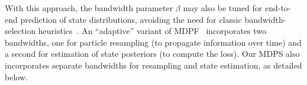         With this approach, the bandwidth parameter $\beta$ may also be tuned for end-to-end prediction of state distributions, avoiding the need for classic bandwidth-selection heuristics~\cite{Silverman86, jones1996brief, bowman1984alternative}.
        An ``adaptive'' variant of MDPF~\cite{younis2023mdpf} incorporates two bandwidths, one for particle resampling (to propagate information over time) and a second for estimation of state posteriors (to compute the loss).  Our MDPS also incorporates separate bandwidths for resampling and state estimation, as detailed below. %
        
        
        
